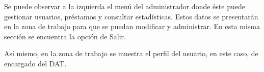 Se puede observar a la izquierda el menú del administrador donde éste puede
gestionar usuarios, préstamos y consultar estadísticas. Estos datos se presentarán en
la zona de trabajo para que se puedan modificar y administrar.
En esta misma sección se encuentra la opción de Salir.

Así mismo, en la zona de trabajo se muestra el perfil del usuario, en este caso, de
encargado del DAT.

